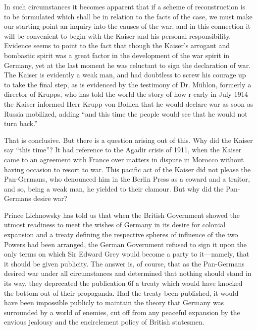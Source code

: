 \documentclass{book}
\begin{document}
In such circumstances it becomes apparent that if a scheme of reconstruction is to be formulated which shall be in relation to the facts of the case, we must make our starting-point an inquiry into the causes of the war, and in this connection it will be convenient to begin with the Kaiser and his personal responsibility. Evidence seems to point to the fact that though the Kaiser’s arrogant and bombastic spirit was a great factor in the development of the war spirit in Germany, yet at the last moment he was reluctant to sign the declaration of war. The Kaiser is evidently a weak man, and had doubtless to screw his courage up to take the final step, as is evidenced by the testimony of Dr. Mühlon, formerly a director of Krupps, who has told the world the story of how r early in July 1914 the Kaiser informed Herr Krupp von Bohlen that he would declare war as soon as Russia mobilized, adding “and this time the people would see that he would not turn back.”

That is conclusive. But there is a question arising out of this. Why did the Kaiser say “this time”? It had reference to the Agadir crisis of 1911, when the Kaiser came to an agreement with France over matters in dispute in Morocco without having occasion to resort to war. This pacific act of the Kaiser did not please the Pan-Germans, who denounced him in the Berlin Press as a coward and a traitor, and so, being a weak man, he yielded to their clamour. But why did the Pan-Germans desire war?

Prince Lichnowsky has told us that when the British Government showed the utmost readiness to meet the wishes of Germany in its desire for colonial expansion and a treaty defining the respective spheres of influence of the two Powers had been arranged, the German Government refused to sign it upon the only terms on which Sir Edward Grey would become a party to it—namely, that it should be given publicity. The answer is, of course, that as the Pan-Germans desired war under all circumstances and determined that nothing should stand in its way, they deprecated the publication 6f a treaty which would have knocked the bottom out of their propaganda. Had the treaty been published, it would have been impossible publicly to maintain the theory that Germany was surrounded by a world of enemies, cut off from any peaceful expansion by the envious jealousy and the encirclement policy of British statesmen.
\end{document}
